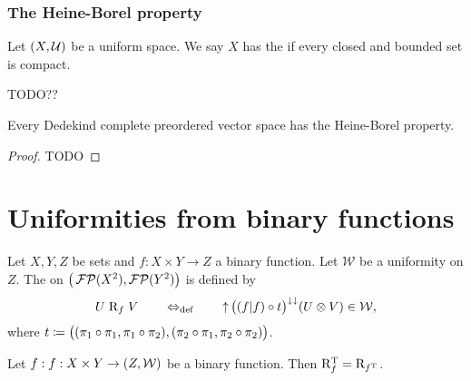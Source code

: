 \subsubsection{The Heine-Borel property}
\begin{definition}
Let $\sSet{X,\mathcal{U}}$ be a uniform space. We say $X$ has the  if every closed and bounded set is compact.
\end{definition}

TODO??
\begin{proposition} \label{DedekindCompleteHeineBorel}
Every Dedekind complete preordered vector space has the Heine-Borel property.
\end{proposition}
\begin{proof}
TODO
\end{proof}

\section{Uniformities from binary functions}
\begin{definition}
Let $X,Y,Z$ be sets and $f: X\times Y\to Z$ a binary function. Let $\mathcal{W}$ be a uniformity on $Z$. The  on $\big(\operatorname{\mathcal{FP}}(X^2),\operatorname{\mathcal{FP}}(Y^2)\big)$ is defined by
\[ U\mathrel{\mathrm{R}_{f}} V \quad\quad\Leftrightarrow_{\text{def}}\quad\quad \operatorname{\uparrow}\big((f|f)\circ t \big)^{\downarrow\downarrow}(U\otimes V) \in \mathcal{W}, \]
where $t \coloneqq \big((\pi_1\circ \pi_1, \pi_1\circ \pi_2),(\pi_2\circ \pi_1, \pi_2\circ \pi_2)\big)$.
\end{definition}

\begin{lemma} \label{transposeFunctionalUniformRelation}
Let $f: f: X\times Y\to \sSet{Z, \mathcal{W}}$ be a binary function. Then $\mathrm{R}_{f}^{\mathrm{T}} = \mathrm{R}_{f^{\mathrm{T}}}$.
\end{lemma}

